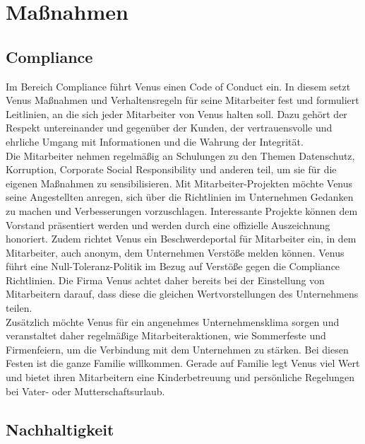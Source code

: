 \documentclass[a4paper, fontsize=12pt, parskip=full, toc=bibliographynumbered]{scrreprt}
\begin{document}




\chapter{Maßnahmen}

\section{Compliance}

Im Bereich Compliance führt Venus einen Code of Conduct ein. In diesem setzt Venus Maßnahmen und Verhaltensregeln für seine Mitarbeiter fest und formuliert
Leitlinien, an die sich jeder Mitarbeiter von Venus halten soll. Dazu gehört der Respekt untereinander und gegenüber der Kunden, der vertrauensvolle und ehrliche Umgang mit Informationen und die Wahrung der Integrität.\\
Die Mitarbeiter nehmen regelmäßig an Schulungen zu den Themen Datenschutz, Korruption, Corporate Social Responsibility und anderen teil, um sie für die eigenen Maßnahmen zu sensibilisieren. Mit Mitarbeiter-Projekten möchte Venus seine Angestellten anregen, sich über die Richtlinien im Unternehmen Gedanken zu machen und Verbesserungen vorzuschlagen. Interessante Projekte können dem Vorstand präsentiert werden und werden durch eine offizielle Auszeichnung honoriert. Zudem richtet Venus ein Beschwerdeportal für Mitarbeiter ein, in dem Mitarbeiter, auch anonym, dem Unternehmen Verstöße melden können. Venus führt eine Null-Toleranz-Politik im Bezug auf Verstöße gegen die Compliance Richtlinien. Die Firma Venus achtet daher bereits bei der Einstellung von Mitarbeitern darauf, dass diese die gleichen Wertvorstellungen des Unternehmens teilen.\\
Zusätzlich möchte Venus für ein angenehmes Unternehmensklima sorgen und veranstaltet daher regelmäßige Mitarbeiteraktionen, wie Sommerfeste und Firmenfeiern, um die Verbindung mit dem Unternehmen zu stärken. Bei diesen Festen ist die ganze Familie willkommen. Gerade auf Familie legt Venus viel Wert und bietet ihren Mitarbeitern eine Kinderbetreuung und persönliche Regelungen bei Vater- oder Mutterschaftsurlaub.


\section{Nachhaltigkeit}
\author{Autor: Leonie Schiburr}
\end{document}
